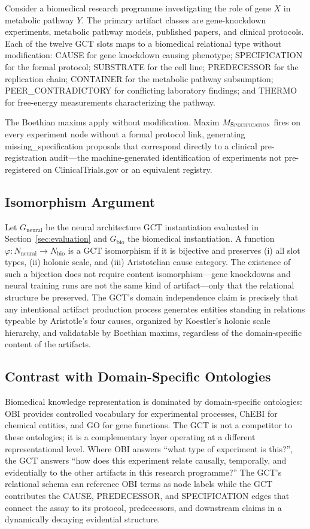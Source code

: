 \documentclass{iosart2x}
\begin{document}
Consider a biomedical research programme investigating the role of gene $X$ in metabolic pathway $Y$. The primary artifact classes are gene-knockdown experiments, metabolic pathway models, published papers, and clinical protocols. Each of the twelve GCT slots maps to a biomedical relational type without modification: CAUSE for gene knockdown causing phenotype; SPECIFICATION for the formal protocol; SUBSTRATE for the cell line; PREDECESSOR for the replication chain; CONTAINER for the metabolic pathway subsumption; PEER\_CONTRADICTORY for conflicting laboratory findings; and THERMO for free-energy measurements characterizing the pathway.

The Boethian maxims apply without modification. Maxim $M_{\textsc{Specification}}$ fires on every experiment node without a formal protocol link, generating missing\_specification proposals that correspond directly to a clinical pre-registration audit---the machine-generated identification of experiments not pre-registered on ClinicalTrials.gov or an equivalent registry.

\subsection{Isomorphism Argument}

Let $G_{\text{neural}}$ be the neural architecture GCT instantiation evaluated in Section~\ref{sec:evaluation} and $G_{\text{bio}}$ the biomedical instantiation. A function $\varphi : N_{\text{neural}} \rightarrow N_{\text{bio}}$ is a GCT isomorphism if it is bijective and preserves (i) all slot types, (ii) holonic scale, and (iii) Aristotelian cause category. The existence of such a bijection does not require content isomorphism---gene knockdowns and neural training runs are not the same kind of artifact---only that the relational structure be preserved. The GCT's domain independence claim is precisely that any intentional artifact production process generates entities standing in relations typeable by Aristotle's four causes, organized by Koestler's holonic scale hierarchy, and validatable by Boethian maxims, regardless of the domain-specific content of the artifacts.

\subsection{Contrast with Domain-Specific Ontologies}

Biomedical knowledge representation is dominated by domain-specific ontologies: OBI provides controlled vocabulary for experimental processes, ChEBI for chemical entities, and GO for gene functions. The GCT is not a competitor to these ontologies; it is a complementary layer operating at a different representational level. Where OBI answers ``what type of experiment is this?'', the GCT answers ``how does this experiment relate causally, temporally, and evidentially to the other artifacts in this research programme?'' The GCT's relational schema can reference OBI terms as node labels while the GCT contributes the CAUSE, PREDECESSOR, and SPECIFICATION edges that connect the assay to its protocol, predecessors, and downstream claims in a dynamically decaying evidential structure.
\end{document}
